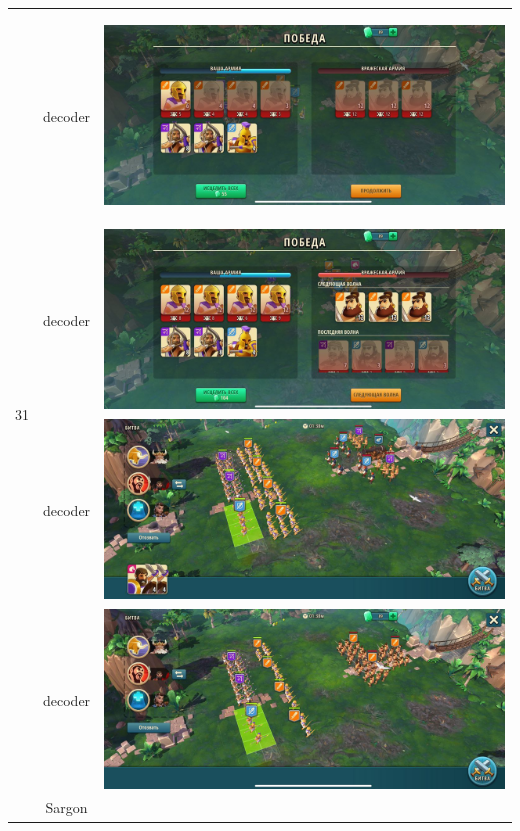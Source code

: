 \begin{longtable}{|c|c|c|}
    \hline
    \multirow{8}{*}{31} & decoder &
    \hypertarget{fight31}{\includegraphics[width=0.75\linewidth]{./parts/media/TreasureHunt/31/decoder/photo_2022-04-07_10-00-46.jpg}} \\
    & decoder &
    \includegraphics[width=0.75\linewidth]{./parts/media/TreasureHunt/31/decoder/photo_2022-04-07_09-59-58.jpg} \\
    & decoder &
    \includegraphics[width=0.75\linewidth]{./parts/media/TreasureHunt/31/decoder/photo_2022-04-07_09-59-48.jpg} \\
    & decoder &
    \includegraphics[width=0.75\linewidth]{./parts/media/TreasureHunt/31/decoder/photo_2022-04-07_10-00-36.jpg} \\
    \hline
    \multirow{8}{*}{31} & Sargon &

\end{longtable}
